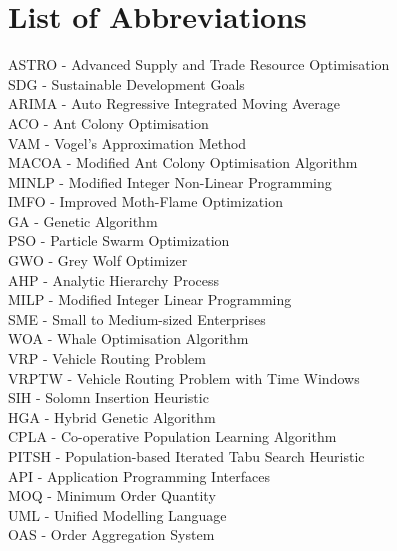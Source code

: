 \chapter*{List of Abbreviations}

ASTRO - Advanced Supply and Trade Resource Optimisation \\
SDG - Sustainable Development Goals \\
ARIMA - Auto Regressive Integrated Moving Average\\
ACO - Ant Colony Optimisation \\
VAM - Vogel's Approximation Method \\
MACOA - Modified Ant Colony Optimisation Algorithm\\
MINLP - Modified Integer Non-Linear Programming \\
IMFO - Improved Moth-Flame Optimization \\
GA - Genetic Algorithm \\
PSO - Particle Swarm Optimization \\
GWO - Grey Wolf Optimizer \\
AHP - Analytic Hierarchy Process \\
MILP - Modified Integer Linear Programming \\
SME - Small to Medium-sized Enterprises \\
WOA - Whale Optimisation Algorithm \\
VRP - Vehicle Routing Problem \\
VRPTW - Vehicle Routing Problem with Time Windows \\
SIH - Solomn Insertion Heuristic \\
HGA - Hybrid Genetic Algorithm \\
CPLA - Co-operative Population Learning Algorithm \\
PITSH - Population-based Iterated Tabu Search Heuristic \\
API - Application Programming Interfaces \\
MOQ - Minimum Order Quantity \\
UML - Unified Modelling Language \\
OAS - Order Aggregation System \\